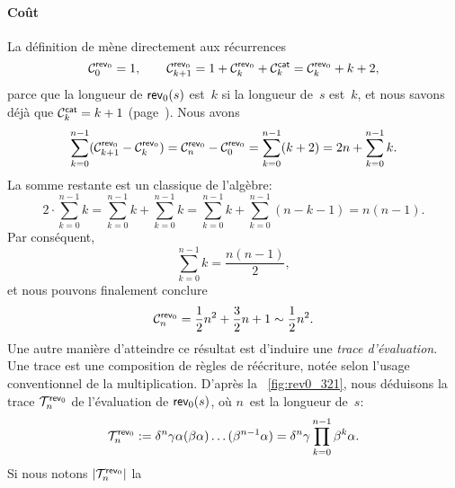 \paragraph{Coût}
\label{cost_rev0}

La définition de 
mène directement aux récurrences
\begin{equation*}
\C{\fun{rev}_0}{0} = 1,\qquad \C{\fun{rev}_0}{k+1} = 1 +
\C{\fun{rev}_0}{k} + \C{\fun{cat}}{k} = \C{\fun{rev}_0}{k} + k + 2,
\end{equation*}
parce que la longueur de \(\fun{rev}_0(s)\) est~\(k\) si la longueur
de~\(s\) est~\(k\), et nous savons déjà que \(\C{\fun{cat}}{k} = k +
1\) (page~\pageref{cost_cat}). Nous
avons
\begin{equation*}
\sum_{k=0}^{n-1}(\C{\fun{rev}_0}{k+1} - \C{\fun{rev}_0}{k}) =
\C{\fun{rev}_0}{n} - \C{\fun{rev}_0}{0} =
\sum_{k=0}^{n-1}(k+2) = 2n + \sum_{k=0}^{n-1}{k}.
\end{equation*}
La somme restante est un classique de l'algèbre:
\begin{equation*}
2 \cdot \sum_{k=0}^{n-1}{k} =
\sum_{k=0}^{n-1}{k} + \sum_{k=0}^{n-1}{k} =
\sum_{k=0}^{n-1}{k} + \sum_{k=0}^{n-1}(n-k-1) = n(n-1).
\end{equation*}
Par conséquent,
\begin{equation}
\sum_{k=0}^{n-1}{k} = \frac{n(n-1)}{2},\label{eq:sum_k}
\end{equation}
et nous pouvons finalement conclure
\begin{equation*}
\C{\fun{rev}_0}{n} = \frac{1}{2}n^2 + \frac{3}{2}n + 1 \sim \frac{1}{2}n^2.
\end{equation*}
Une autre manière d'atteindre ce résultat est d'induire une
\emph{trace d'évaluation}. Une trace est une composition de
règles de réécriture, notée selon l'usage conventionnel de la
multiplication. D'après la \fig~\vref{fig:rev0_321}, nous déduisons la
trace \(\T{\fun{rev}_0}{n}\) de
l'évaluation de \(\fun{rev}_0(s)\), où
\(n\)~est la longueur de~\(s\):
\begin{equation*}
\T{\fun{rev}_0}{n} :=
\delta^n\gamma\alpha(\beta\alpha)\dots(\beta^{n-1}\alpha) =
\delta^n\gamma \prod_{k=0}^{n-1}{\beta^k\alpha}.
\end{equation*}
Si nous notons
\(\len{\T{\fun{rev}_0}{n}}\) la
